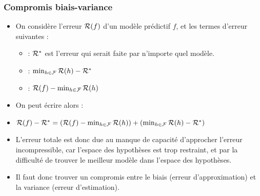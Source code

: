 \begin{frame}
  \frametitle{Compromis biais-variance}
  \begin{itemize}
    \item On considère l'erreur $\mathcal{R}(f)$ d'un modèle prédictif $f$, et les termes d'erreur suivantes : 
    \begin{itemize}
    \item {} : $\mathcal{R}^{\ast}$ est l'erreur qui serait faite par n'importe quel modèle.
    \item {} : $\min_{h \in \mathcal{F}}\mathcal{R}(h) - \mathcal{R}^{\ast}$ 
    \item {} : $\mathcal{R}(f) - \min_{h \in \mathcal{F}}\mathcal{R}(h)$
  \end{itemize}
    \item On peut écrire alors : 
    \item[] $\mathcal{R}(f) - \mathcal{R}^{\ast} = (\mathcal{R}(f) - \min_{h \in \mathcal{F}}\mathcal{R}(h)) + (\min_{h \in \mathcal{F}}\mathcal{R}(h) - \mathcal{R}^{\ast})$
    \item L'erreur totale est donc due au manque de capacité d'approcher l'erreur incompressible, car l'espace des hypothèses est trop restraint, et par la difficulté de trouver le meilleur modèle dans l'espace des hypothèses. 
    \item Il faut donc trouver un compromis entre le biais (erreur d'approximation) et la variance (erreur d'estimation). 
  \end{itemize}
\end{frame}

